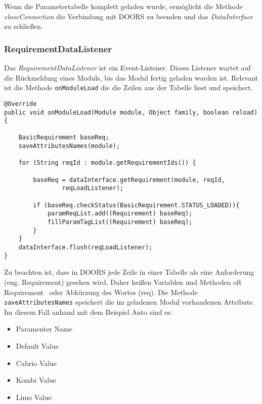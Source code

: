 Wenn die Parametertabelle komplett geladen wurde, ermöglicht die Methode \textit{closeConnection} die Verbindung mit DOORS zu beenden und das \textit{DataInterface} zu schließen.





\subsubsection{RequirementDataListener}\label{sub.RequirementDataListener}

Das \textit{RequirementDataListener} ist ein Event-Listener. Dieses Listener wartet auf die Rückmeldung eines Moduls, bis das Modul fertig geladen worden ist. Relevant ist die Methode \texttt{onModuleLoad} die die Zeilen aus der Tabelle liest und speichert.\\

\begin{lstlisting}[caption={Laden der Parametertabelle nach Zeilen}, captionpos=b]
@Override
public void onModuleLoad(Module module, Object family, boolean reload){

	BasicRequirement baseReq;
	saveAttributesNames(module);
				
	for (String reqId : module.getRequirementIds()) {

		baseReq = dataInterface.getRequirement(module, reqId,
				reqLoadListener);

		if (baseReq.checkStatus(BasicRequirement.STATUS_LOADED)){
			paramReqList.add((Requirement) baseReq);
			fillParamTagList((Requirement) baseReq);
		}
	}
	dataInterface.flush(reqLoadListener);
}
\end{lstlisting}

Zu beachten ist, dass in DOORS jede Zeile in einer Tabelle als eine Anforderung (eng. Requirement) gesehen wird. Daher heißen Variablen und Methoden oft \glqq Requirement\grqq~ oder Abkürzung des Wortes (req). Die Methode \texttt{saveAttributesNames} speichert die im geladenen Modul vorhandenen Attribute. Im diesem Fall anhand mit dem Beispiel Auto sind es:

\begin{itemize}\itemsep1pt
\item Paramenter Name
\item Default Value
\item Cabrio Value
\item Kombi Value
\item Limo Value
\end{itemize}

